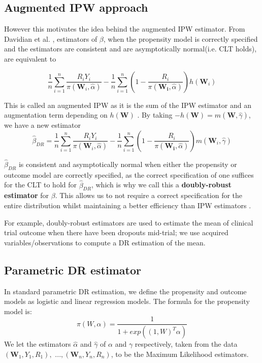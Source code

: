 \documentclass[12pt,twoside]{article}
\begin{document}
\subsection{Augmented IPW approach} 

However this motivates the idea behind the augmented IPW estimator. From Davidian et al. \cite{davidian}, estimators of $\beta$, when the propensity model is correctly specified and the estimators are consistent and are asymptotically normal(i.e. CLT holds), are equivalent to 

\begin{equation}
    \frac{1}{n}\sum_{i=1}^{n}\frac{R_iY_i}{\pi(\mathbf{W}_i, \hat{\alpha})} - \frac{1}{n}\sum_{i=1}^{n} \left(1 - \frac{R_i}{\pi(\mathbf{W_i},\hat{\alpha})} \right) h(\mathbf{W}_i)
\end{equation}

This is called an augmented IPW as it is the sum of the IPW estimator and an augmentation term depending on $h(\mathbf{W})$ \cite{davidian}. By taking $-h(\mathbf{W}) = m(\mathbf{W}, \hat{\gamma})$, we have a new estimator
\begin{equation}
    \hat\beta_{DR} = \frac{1}{n}\sum_{i=1}^{n}\frac{R_iY_i}{\pi(\mathbf{W}_i, \hat{\alpha})} - \frac{1}{n}\sum_{i=1}^{n} \left(1 - \frac{R_i}{\pi(\mathbf{W_i},\hat{\alpha})} \right) m(\mathbf{W}_i, \hat\gamma)
\end{equation}

$\hat\beta_{DR}$ is consistent and asymptotically normal when either the propensity or outcome model are correctly specified, as the correct specification of one suffices for the CLT to hold for $\hat\beta_{DR}$, which is why we call this a \textbf{doubly-robust estimator} for $\beta$. This allows us to not require a correct specification for the entire distribution whilst maintaining a better efficiency than IPW estimators \cite{vansteelandt}.

For example, doubly-robust estimators are used to estimate the mean of clinical trial outcome when there have been dropouts mid-trial; we use acquired variables/observations to compute a DR estimation of the mean. \\

\subsection{Parametric DR estimator}

In standard parametric DR estimation, we define the propensity and outcome models as logistic and linear regression models. The formula for the propensity model is:
\begin{equation*}
    \pi(W,\alpha) = \frac{1}{1+exp((1,W)^T\alpha)} 
\end{equation*}
We let the estimators $\hat{\alpha}$ and $\hat\gamma$ of $\alpha$ and $\gamma$ respectively, taken from the data $(\mathbf{W}_1, Y_1, R_1),$ $...,(\mathbf{W}_n, Y_n, R_n)$, to be the Maximum Likelihood estimators. \\
\end{document}
